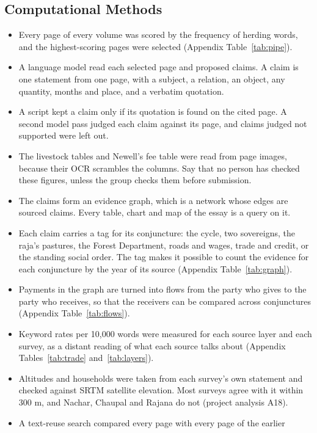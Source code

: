 \documentclass[11pt,a4paper]{article}
\newcommand{\cit}[1]{{\small(#1)}}
\begin{document}
\subsection{Computational Methods}
\begin{itemize}
\item Every page of every volume was scored by the frequency of herding words,
  and the highest-scoring pages were selected \cit{Appendix
  Table~\ref{tab:pipe}}.
\item A language model read each selected page and proposed claims. A claim
  is one statement from one page, with a subject, a relation, an object, any
  quantity, months and place, and a verbatim quotation.
\item A script kept a claim only if its quotation is found on the cited page.
  A second model pass judged each claim against its page, and claims judged
  not supported were left out.
\item The livestock tables and Newell's fee table were read from page images,
  because their OCR scrambles the columns. Say that no person has checked these
  figures, unless the group checks them before submission.
\item The claims form an evidence graph, which is a network whose edges are
  sourced claims. Every table, chart and map of the essay is a query on it.
\item Each claim carries a tag for its conjuncture: the cycle, two sovereigns,
  the raja's pastures, the Forest Department, roads and wages, trade and credit,
  or the standing social order. The tag makes it possible to count the
  evidence for each conjuncture by the year of its source \cit{Appendix
  Table~\ref{tab:graph}}.
\item Payments in the graph are turned into flows from the party who gives to
  the party who receives, so that the receivers can be compared across
  conjunctures \cit{Appendix Table~\ref{tab:flows}}.
\item Keyword rates per 10,000 words were measured for each source layer and
  each survey, as a distant reading of what each source talks about
  \cit{Appendix Tables~\ref{tab:trade} and~\ref{tab:layers}}.
\item Altitudes and households were taken from each survey's own statement and
  checked against SRTM satellite elevation. Most surveys agree with it within
  300 m, and Nachar, Chaupal and Rajana do not \cit{project analysis A18}.
\item A text-reuse search compared every page with every page of the earlier

\end{itemize}
\end{document}
